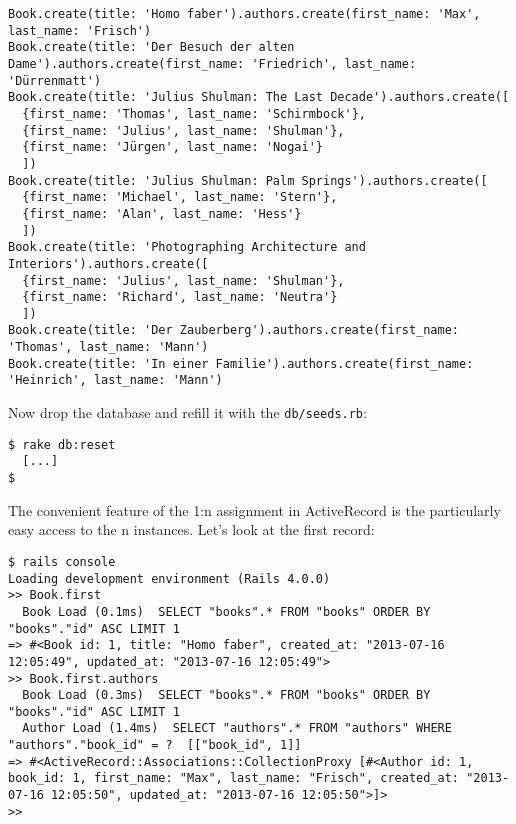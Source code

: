 \documentclass[a4paper]{book}
\newcounter{tab}[chapter]
\begin{document}
\begin{shaded}\begin{verbatim}
Book.create(title: 'Homo faber').authors.create(first_name: 'Max', last_name: 'Frisch')
Book.create(title: 'Der Besuch der alten Dame').authors.create(first_name: 'Friedrich', last_name: 'Dürrenmatt')
Book.create(title: 'Julius Shulman: The Last Decade').authors.create([
  {first_name: 'Thomas', last_name: 'Schirmbock'},
  {first_name: 'Julius', last_name: 'Shulman'},
  {first_name: 'Jürgen', last_name: 'Nogai'}
  ])
Book.create(title: 'Julius Shulman: Palm Springs').authors.create([
  {first_name: 'Michael', last_name: 'Stern'},
  {first_name: 'Alan', last_name: 'Hess'}
  ])
Book.create(title: 'Photographing Architecture and Interiors').authors.create([
  {first_name: 'Julius', last_name: 'Shulman'},
  {first_name: 'Richard', last_name: 'Neutra'}
  ])
Book.create(title: 'Der Zauberberg').authors.create(first_name: 'Thomas', last_name: 'Mann')
Book.create(title: 'In einer Familie').authors.create(first_name: 'Heinrich', last_name: 'Mann')
\end{verbatim}\end{shaded}

Now drop the database and refill it with the \texttt{db/seeds.rb}:

\begin{shaded}\begin{verbatim}
$ rake db:reset
  [...]
$
\end{verbatim}\end{shaded}

The convenient feature of the 1:n assignment in ActiveRecord is the particularly easy access to the n instances. Let's look at the first record:

\begin{shaded}\begin{verbatim}
$ rails console
Loading development environment (Rails 4.0.0)
>> Book.first
  Book Load (0.1ms)  SELECT "books".* FROM "books" ORDER BY "books"."id" ASC LIMIT 1
=> #<Book id: 1, title: "Homo faber", created_at: "2013-07-16 12:05:49", updated_at: "2013-07-16 12:05:49">
>> Book.first.authors
  Book Load (0.3ms)  SELECT "books".* FROM "books" ORDER BY "books"."id" ASC LIMIT 1
  Author Load (1.4ms)  SELECT "authors".* FROM "authors" WHERE "authors"."book_id" = ?  [["book_id", 1]]
=> #<ActiveRecord::Associations::CollectionProxy [#<Author id: 1, book_id: 1, first_name: "Max", last_name: "Frisch", created_at: "2013-07-16 12:05:50", updated_at: "2013-07-16 12:05:50">]>
>>
\end{verbatim}\end{shaded}
\end{document}
